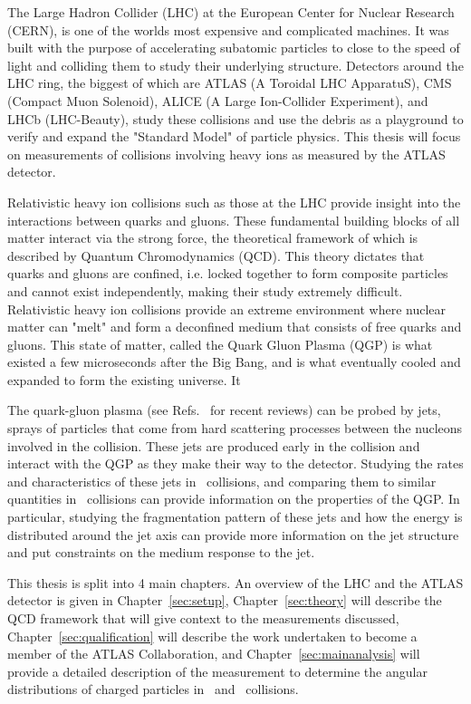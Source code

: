 

The Large Hadron Collider (LHC) at the European Center for Nuclear Research (CERN), is one of the worlds most expensive and complicated machines. It was built with the purpose of accelerating subatomic particles to close to the speed of light and colliding them to study their underlying structure. Detectors around the LHC ring, the biggest of which are  ATLAS (A Toroidal LHC ApparatuS), CMS (Compact Muon Solenoid), ALICE (A Large Ion-Collider Experiment), and LHCb (LHC-Beauty), study these collisions and use the debris as a playground to verify and expand the "Standard Model" of particle physics. This thesis will focus on measurements of collisions involving heavy ions as measured by the ATLAS detector.

Relativistic heavy ion collisions such as those at the LHC provide insight into the interactions between quarks and gluons. These fundamental building blocks of all matter interact via the strong force, the theoretical framework of which is described by Quantum Chromodynamics (QCD). This theory dictates that quarks and gluons are confined, i.e. locked together to form composite particles and cannot exist independently, making their study extremely difficult. Relativistic heavy ion collisions provide an extreme environment where nuclear matter can "melt" and form a deconfined medium that consists of free quarks and gluons. This state of matter, called the Quark Gluon Plasma (QGP) is what existed a few microseconds after the Big Bang, and is what eventually cooled and expanded to form the existing universe. It

The quark-gluon plasma (see Refs.~\cite{Roland:2014jsa,Busza:2018rrf} for recent reviews) can be probed by jets, sprays of particles that come from hard scattering processes between the nucleons involved in the collision. These jets are produced early in the collision and interact with the QGP as they make their way to the detector. Studying the rates and characteristics of these jets in \pbpb\ collisions, and comparing them to similar quantities in \pp\ collisions can provide information on the properties of the QGP. In particular, studying the  fragmentation pattern of these jets and how the energy is distributed around the jet axis can provide more information on the jet structure and put constraints on the medium response to the jet.

This thesis is split into 4 main chapters. An overview of the LHC and the ATLAS detector is given in Chapter~\ref{sec:setup}, Chapter~\ref{sec:theory} will describe the QCD framework that will give context to the measurements discussed, Chapter~\ref{sec:qualification} will describe the work undertaken to become a member of the ATLAS Collaboration, and Chapter~\ref{sec:mainanalysis} will provide a detailed description of the measurement to determine the angular distributions of charged particles in \pbpb\ and \pp\ collisions. 

